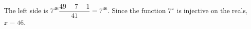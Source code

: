 The left side is $ 7^{46}\dfrac{49-7-1}{41}=7^{46}$. Since the function $ 7^x $ is injective on the reals, $\boxed{x=46}$.
